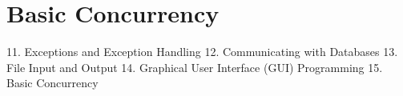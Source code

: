 \chapter{Basic Concurrency}

11. Exceptions and Exception Handling
12. Communicating with Databases
13. File Input and Output
14. Graphical User Interface (GUI) Programming
15. Basic Concurrency